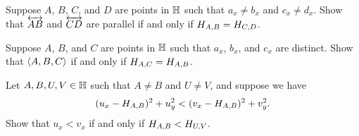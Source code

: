 \begin{exercise}\label{exerc:hhp-parallel-criterion}
Suppose \(A\), \(B\), \(C\), and \(D\) are points in \(\mathbb{H}\) such that \(a_x \neq b_x\) and \(c_x \neq d_x\).
Show that \(\overleftrightarrow{AB}\) and \(\overleftrightarrow{CD}\) are parallel if and only if \(H_{A,B} = H_{C,D}\).
\end{exercise}


\begin{exercise}\label{exerc:hhp-collinearity-criterion}
Suppose \(A\), \(B\), and \(C\) are points in \(\mathbb{H}\) such that \(a_x\), \(b_x\), and \(c_x\) are distinct.
Show that \(\langle A, B, C \rangle\) if and only if \(H_{A,C} = H_{A,B}\).
\end{exercise}


\begin{exercise}\label{exerc:hhp-ideal-point-inequality}
Let \(A,B,U,V \in \mathbb{H}\) such that \(A \neq B\) and \(U \neq V\), and suppose we have \[ (u_x - H_{A,B})^2 + u_y^2 < (v_x - H_{A,B})^2 + v_y^2. \]
Show that \(u_x < v_x\) if and only if \(H_{A,B} < H_{U,V}\).
\end{exercise}
